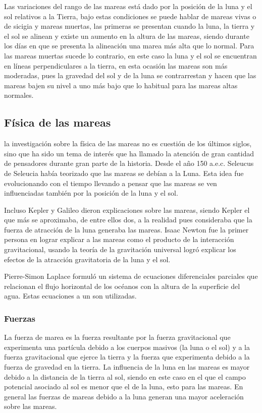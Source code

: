 Las variaciones del rango de las mareas está dado por la posición de la luna y el sol relativos a la Tierra, bajo estas condiciones se puede hablar de mareas vivas o de sicigia y mareas muertas, las primeras se presentan cuando la luna, la tierra y el sol se alinean y existe un aumento en la altura de las mareas, siendo durante los días en que se presenta la alineación una marea más alta que lo normal. Para las mareas muertas sucede lo contrario, en este caso la luna y el sol se encuentran en líneas perpendiculares a la tierra, en esta ocasión las mareas son más moderadas, pues la gravedad del sol y de la luna se contrarrestan y hacen que las mareas bajen su nivel a uno más bajo que lo habitual para las mareas altas normales.

\subsection{Física de las mareas}
la investigación sobre la física de las mareas no es cuestión de los últimos siglos, sino que ha sido un tema de interés que ha llamado la atención de gran cantidad de pensadores durante gran parte de la historia. Desde el año 150 a.e.c. Seleucus de Seleucia había teorizado que las mareas se debían a la Luna. Esta idea fue evolucionando con el tiempo llevando a pensar que las mareas se ven influenciadas también por la posición de la luna y el sol.

Incluso Kepler y Galileo dieron explicaciones sobre las mareas, siendo Kepler el que más se aproximaba, de entre ellos dos, a la realidad pues consideraba que la fuerza de atracción de la luna generaba las mareas. Isaac Newton fue la primer persona en lograr explicar a las mareas como el producto de la interacción gravitacional, usando la teoría de la gravitación universal logró explicar los efectos de la atracción gravitatoria de la luna y el sol.

Pierre-Simon Laplace formuló un sistema de ecuaciones diferenciales parciales que relacionan el flujo horizontal de los océanos con la altura de la superficie del agua. Estas ecuaciones a un son utilizadas.

\subsubsection{Fuerzas}
La fuerza  de marea es la fuerza resultante por la fuerza gravitacional que experimenta una partícula debido a los cuerpos masivos (la luna o el sol) y a la fuerza gravitacional que ejerce la tierra y la fuerza que experimenta debido a la fuerza de gravedad en la tierra. La influencia de la luna en las mareas es mayor debido a la distancia de la tierra al sol, siendo en este caso en el que el campo potencial asociado al sol es menor que el de la luna, esto para las mareas. En general las fuerzas de mareas debido a la luna generan una mayor aceleración sobre las mareas.

